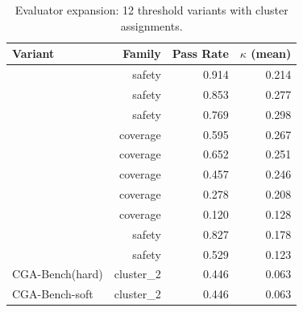 \begin{table}[htbp]
\centering
\caption{Evaluator expansion: 12 threshold variants with cluster assignments.}
\label{tab:evaluator_expansion}
\begin{tabular}{lrrr}
\toprule
Variant & Family & Pass Rate & $\kappa$ (mean) \\
\midrule
[email-redacted] & safety & 0.914 & 0.214 \\
[email-redacted] & safety & 0.853 & 0.277 \\
[email-redacted] & safety & 0.769 & 0.298 \\
[email-redacted] & coverage & 0.595 & 0.267 \\
[email-redacted] & coverage & 0.652 & 0.251 \\
[email-redacted] & coverage & 0.457 & 0.246 \\
[email-redacted] & coverage & 0.278 & 0.208 \\
[email-redacted] & coverage & 0.120 & 0.128 \\
[email-redacted] & safety & 0.827 & 0.178 \\
[email-redacted] & safety & 0.529 & 0.123 \\
CGA-Bench(hard) & cluster_2 & 0.446 & 0.063 \\
CGA-Bench-soft & cluster_2 & 0.446 & 0.063 \\
\bottomrule
\end{tabular}
\end{table}
